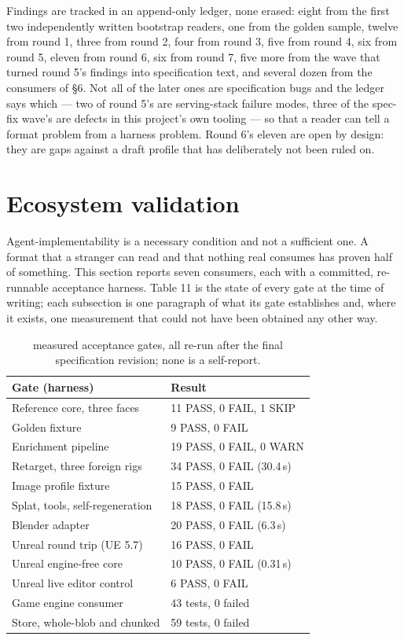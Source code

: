 \documentclass[10pt,twocolumn,letterpaper]{article}
\begin{document}
Findings are tracked in an append-only ledger, none erased: eight from the first two independently written bootstrap readers, one from the golden sample, twelve from round 1, three from round 2, four from round 3, five from round 4, six from round 5, eleven from round 6, six from round 7, five more from the wave that turned round 5's findings into specification text, and several dozen from the consumers of \S6. Not all of the later ones are specification bugs and the ledger says which --- two of round 5's are serving-stack failure modes, three of the spec-fix wave's are defects in this project's own tooling --- so that a reader can tell a format problem from a harness problem. Round 6's eleven are open by design: they are gaps against a draft profile that has deliberately not been ruled on.

\section{Ecosystem validation}

Agent-implementability is a necessary condition and not a sufficient one. A format that a stranger can read and that nothing real consumes has proven half of something. This section reports seven consumers, each with a committed, re-runnable acceptance harness. Table 11 is the state of every gate at the time of writing; each subsection is one paragraph of what its gate establishes and, where it exists, one measurement that could not have been obtained any other way.

\begin{table}[t]\centering\footnotesize
\caption{measured acceptance gates, all re-run after the final specification revision; none is a self-report.}
\begin{tabular}{@{}L{4.9cm} L{2.4cm}@{}}
\toprule
Gate (harness) & Result \\
\midrule
Reference core, three faces & 11 PASS, 0 FAIL, 1 SKIP \\
Golden fixture & 9 PASS, 0 FAIL \\
Enrichment pipeline & 19 PASS, 0 FAIL, 0 WARN \\
Retarget, three foreign rigs & 34 PASS, 0 FAIL (30.4\,s) \\
Image profile fixture & 15 PASS, 0 FAIL \\
Splat, tools, self-regeneration & 18 PASS, 0 FAIL (15.8\,s) \\
Blender adapter & 20 PASS, 0 FAIL (6.3\,s) \\
Unreal round trip (UE 5.7) & 16 PASS, 0 FAIL \\
Unreal engine-free core & 10 PASS, 0 FAIL (0.31\,s) \\
Unreal live editor control & 6 PASS, 0 FAIL \\
Game engine consumer & 43 tests, 0 failed \\
Store, whole-blob and chunked & 59 tests, 0 failed \\
\bottomrule
\end{tabular}
\end{table}
\end{document}
